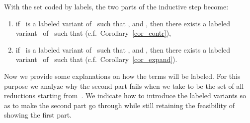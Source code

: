 \documentclass[a4paper,UKenglish]{lipics-v2016}
\begin{document}
With the set  coded by labels, the two parts of
the inductive step become:
\begin{enumerate}
\item if~ is a labeled variant of~ such that ,
  and , then there exists a labeled variant~
  of~ such that  (c.f.~Corollary~\ref{cor_contr}),
\item if~ is a labeled variant of~ such that ,
  and , then there exists a labeled
  variant~ of~ such that 
  (c.f.~Corollary~\ref{cor_expand}).
\end{enumerate}

Now we provide some explanations on how the terms will be labeled. For
this purpose we analyze why the second part fails when we take
 to be the set of all reductions starting
from~. We indicate how to introduce the labeled variants so as to
make the second part go through while still retaining the feasibility
of showing the first part.
\end{document}
